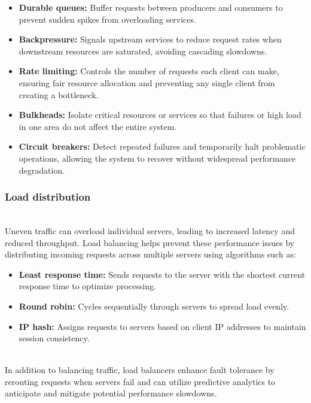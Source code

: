 \begin{itemize}
\item
\protect{}\label{y5MOC2HOJ14O0chA09Vxa}
\textbf{Durable queues:} Buffer requests between producers and consumers to prevent sudden spikes from overloading services.
\item
\protect{}\label{PGoP38OT2URaPbf8ZcQZb}
\textbf{Backpressure:} Signals upstream services to reduce request rates when downstream resources are saturated, avoiding cascading slowdowns.
\item
\protect{}\label{5HQqG3j9g8qO4a-JDd3yS}
\textbf{Rate limiting:} Controls the number of requests each client can make, ensuring fair resource allocation and preventing any single client from creating a bottleneck.
\item
\protect{}\label{_-n4dL1MGD9t7vIU6-4rd}
\textbf{Bulkheads:} Isolate critical resources or services so that failures or high load in one area do not affect the entire system.
\item
\protect{}\label{dBbWdTkcSESbr7y8fiJ9Y}
\textbf{Circuit breakers:} Detect repeated failures and temporarily halt problematic operations, allowing the system to recover without widespread performance degradation.
\end{itemize}

\subsubsection{Load distribution}\label{5DqTzoLYc2WZ1tdfF1vhR}
\\
Uneven traffic can overload individual servers, leading to increased latency and reduced throughput. Load balancing helps prevent these performance issues by distributing incoming requests across multiple servers using algorithms such as:

\begin{itemize}
\item
\protect{}\label{n1B1oXpxCDAZup0MXrOc5}
\textbf{Least response time:} Sends requests to the server with the shortest current response time to optimize processing.
\item
\protect{}\label{UYJRBPE9YaVaLb2uXj4cp}
\textbf{Round robin:} Cycles sequentially through servers to spread load evenly.
\item
\protect{}\label{wWLihF7LpHJthEFQmCnEi}
\textbf{IP hash:} Assigns requests to servers based on client IP addresses to maintain session consistency.
\end{itemize}
\\
In addition to balancing traffic, load balancers enhance fault tolerance by rerouting requests when servers fail and can utilize predictive analytics to anticipate and mitigate potential performance slowdowns.

